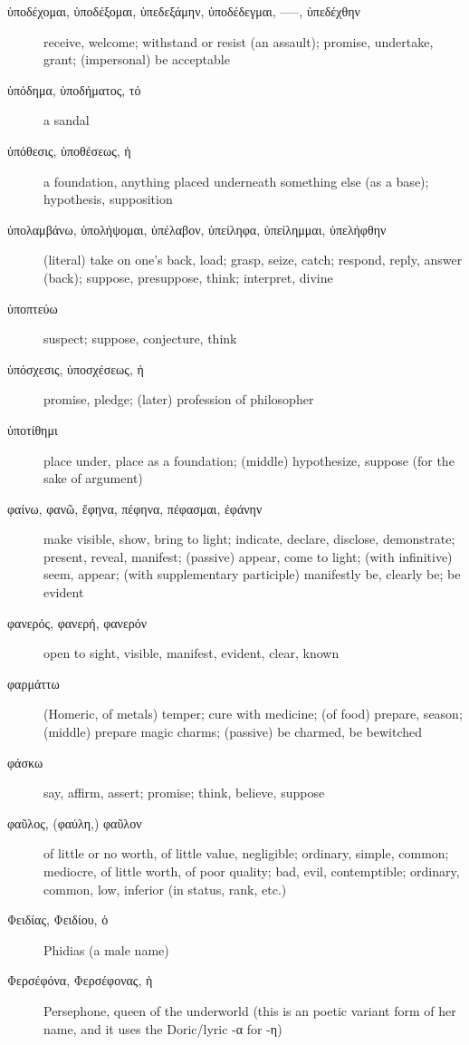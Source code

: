 \documentclass[12pt,letterpaper]{article}
\begin{document}
\begin{description}
    \item[\textgreek{ὑποδέχομαι, ὑποδέξομαι, ὑπεδεξάμην, ὑποδέδεγμαι, –––, ὑπεδέχθην}] receive, welcome; withstand or resist (an assault); promise, undertake, grant; (impersonal) be acceptable
    \item[\textgreek{ὑπόδημα, ὑποδήματος, τό}] a sandal
    \item[\textgreek{ὑπόθεσις, ὑποθέσεως, ἡ}] a foundation, anything placed underneath something else (as a base); hypothesis, supposition
    \item[\textgreek{ὑπολαμβάνω, ὑπολήψομαι, ὑπέλαβον, ὑπείληφα, ὑπείλημμαι, ὑπελήφθην}] \marginnote{*}(literal) take on one's back, load; grasp, seize, catch; respond, reply, answer (back); suppose, presuppose, think; interpret, divine
    \item[\textgreek{ὑποπτεύω}] suspect; suppose, conjecture, think
    \item[\textgreek{ὑπόσχεσις, ὑποσχέσεως, ἡ}] promise, pledge; (later) profession of philosopher
    \item[\textgreek{ὑποτίθημι}] place under, place as a foundation; (middle) hypothesize, suppose (for the sake of argument)
    \item[\textgreek{φαίνω, φανῶ, ἔφηνα, πέφηνα, πέφασμαι, ἐφάνην}] \marginnote{*}make visible, show, bring to light; indicate, declare, disclose, demonstrate; present, reveal, manifest; (passive) appear, come to light; (with infinitive) seem, appear; (with supplementary participle) manifestly be, clearly be; be evident
    \item[\textgreek{φανερός, φανερή, φανερόν}] \marginnote{*}open to sight, visible, manifest, evident, clear, known
    \item[\textgreek{φαρμάττω}] (Homeric, of metals) temper; cure with medicine; (of food) prepare, season; (middle) prepare magic charms; (passive) be charmed, be bewitched
    \item[\textgreek{φάσκω}] say, affirm, assert; promise; think, believe, suppose
    \item[\textgreek{φαῦλος, (φαύλη,) φαῦλον}] of little or no worth, of little value, negligible; ordinary, simple, common; mediocre, of little worth, of poor quality; bad, evil, contemptible; ordinary, common, low, inferior (in status, rank, etc.)
    \item[\textgreek{Φειδίας, Φειδίου, ὁ}] Phidias (a male name)
    \item[\textgreek{Φερσέφόνα, Φερσέφονας, ἡ}] Persephone, queen of the underworld (this is an poetic variant form of her name, and it uses the Doric/lyric -\textgreek{α} for -\textgreek{η})

\end{description}
\end{document}

